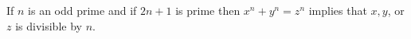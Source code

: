 If $n$ is an odd prime and if $2n + 1$ is prime then $x^n + y^n = z^n$ implies that $x, y$, or $z$ is divisible by $n$.
